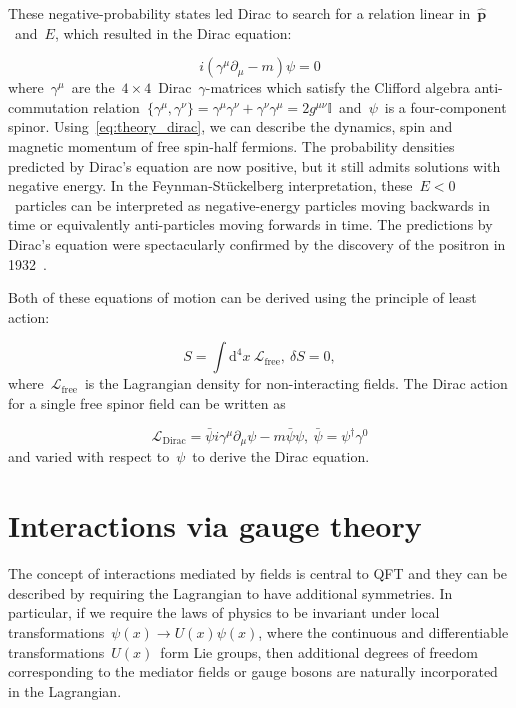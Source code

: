 These negative-probability states led Dirac to search for a relation linear in~$\hat{\mathbf{p}}$~and~$E$, which resulted in the Dirac equation:

\begin{equation}
\label{eq:theory_dirac}
i (\gamma^\mu \partial_\mu - m) \psi = 0
\end{equation}
where~$\gamma^\mu$~are the~$4\times4$~Dirac~$\gamma$-matrices which satisfy the Clifford algebra anti-commutation relation~$\{ \gamma^\mu, \gamma^\nu \} = \gamma^\mu \gamma^\nu + \gamma^\nu \gamma^\mu = 2 g^{\mu\nu} \mathbb{I}$~and~$\psi$~is a four-component spinor. Using~\cref{eq:theory_dirac}, we can describe the dynamics, spin and magnetic momentum of free spin-half fermions. The probability densities predicted by Dirac's equation are now positive, but it still admits solutions with negative energy. In the Feynman-Stückelberg interpretation, these~$E<0$~particles can be interpreted as negative-energy particles moving backwards in time or equivalently anti-particles moving forwards in time. The predictions by Dirac's equation were spectacularly confirmed by the discovery of the positron in 1932~\cite{anderson1933positive}.

Both of these equations of motion can be derived using the principle of least action:

\begin{equation}
\label{eq:theory_action}
S = \int \mathrm{d}^4x\ \mathcal{L}_{\mathrm{free}},\ \delta S = 0,
\end{equation}
where~$\mathcal{L}_{\mathrm{free}}$~is the Lagrangian density for non-interacting fields. The Dirac action for a single free spinor field can be written as

\begin{equation}
\label{eq:theory_kg_lagrangian}
\mathcal{L}_{\mathrm{Dirac}} = \bar{\psi} i \gamma^\mu \partial_\mu \psi - m \bar{\psi} \psi,\ \bar{\psi} = \psi^\dagger \gamma^0
\end{equation}
and varied with respect to~$\psi$~to derive the Dirac equation.

\section{Interactions via gauge theory}
The concept of interactions mediated by fields is central to QFT and they can be described by requiring the Lagrangian to have additional symmetries. In particular, if we require the laws of physics to be invariant under local transformations~$\psi(x) \rightarrow U(x) \psi(x)$, where the continuous and differentiable transformations~$U(x)$~form Lie groups, then additional degrees of freedom corresponding to the mediator fields or gauge bosons are naturally incorporated in the Lagrangian.


